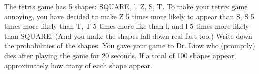 The tetris game has 5 shapes: 
SQUARE, l, Z, S, T.
To make your tetrix game annoying, you have decided to make Z
5 times more likely to appear than S, S 5 times more likely than T,
T 5 times more like than l, and l 5 times more likely than SQUARE.
(And you make the shapes fall down real fast too.)
Write down the probabilities of the shapes. 
You gave your game to Dr. Liow who (promptly) dies after
playing the game for 20 seconds.
If a total of 100 shapes appear, approximately how many of each shape
appear.
